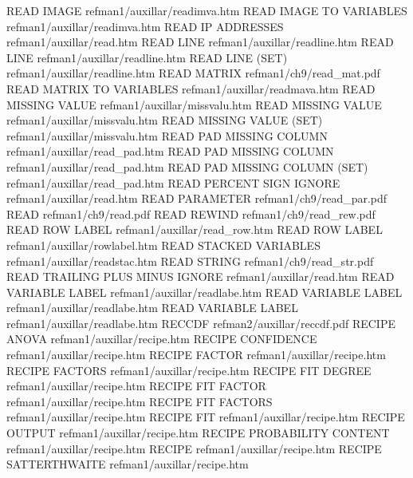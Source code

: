 READ IMAGE                              refman1/auxillar/readimva.htm
READ IMAGE TO VARIABLES                 refman1/auxillar/readimva.htm
READ IP ADDRESSES                       refman1/auxillar/read.htm
READ LINE                               refman1/auxillar/readline.htm
READ LINE                               refman1/auxillar/readline.htm
READ LINE (SET)                         refman1/auxillar/readline.htm
READ MATRIX                             refman1/ch9/read_mat.pdf
READ MATRIX TO VARIABLES                refman1/auxillar/readmava.htm
READ MISSING VALUE                      refman1/auxillar/missvalu.htm
READ MISSING VALUE                      refman1/auxillar/missvalu.htm
READ MISSING VALUE (SET)                refman1/auxillar/missvalu.htm
READ PAD MISSING COLUMN                 refman1/auxillar/read_pad.htm
READ PAD MISSING COLUMN                 refman1/auxillar/read_pad.htm
READ PAD MISSING COLUMN (SET)           refman1/auxillar/read_pad.htm
READ PERCENT SIGN IGNORE                refman1/auxillar/read.htm
READ PARAMETER                          refman1/ch9/read_par.pdf
READ                                    refman1/ch9/read.pdf
READ REWIND                             refman1/ch9/read_rew.pdf
READ ROW LABEL                          refman1/auxillar/read_row.htm
READ ROW LABEL                          refman1/auxillar/rowlabel.htm
READ STACKED VARIABLES                  refman1/auxillar/readstac.htm
READ STRING                             refman1/ch9/read_str.pdf
READ TRAILING PLUS MINUS IGNORE         refman1/auxillar/read.htm
READ VARIABLE LABEL                     refman1/auxillar/readlabe.htm
READ VARIABLE LABEL                     refman1/auxillar/readlabe.htm
READ VARIABLE LABEL                     refman1/auxillar/readlabe.htm
RECCDF                                  refman2/auxillar/reccdf.pdf
RECIPE ANOVA                            refman1/auxillar/recipe.htm
RECIPE CONFIDENCE                       refman1/auxillar/recipe.htm
RECIPE FACTOR                           refman1/auxillar/recipe.htm
RECIPE FACTORS                          refman1/auxillar/recipe.htm
RECIPE FIT DEGREE                       refman1/auxillar/recipe.htm
RECIPE FIT FACTOR                       refman1/auxillar/recipe.htm
RECIPE FIT FACTORS                      refman1/auxillar/recipe.htm
RECIPE FIT                              refman1/auxillar/recipe.htm
RECIPE OUTPUT                           refman1/auxillar/recipe.htm
RECIPE PROBABILITY CONTENT              refman1/auxillar/recipe.htm
RECIPE                                  refman1/auxillar/recipe.htm
RECIPE SATTERTHWAITE                    refman1/auxillar/recipe.htm
